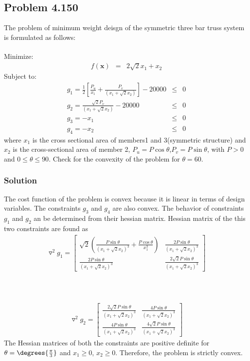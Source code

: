 \documentclass[]{report}
\begin{document}
\subsection*{Problem 4.150}
The problem of minimum weight deisgn of the symmetric three bar truss system is formulated as follows:\\~\\
Minimize:
\begin{eqnarray*}
f\left(\mathbf x\right) &=& 2\sqrt{2}x_1+x_2
\end{eqnarray*} 
Subject to:
\begin{eqnarray*}
g_1=\frac{1}{2}\left[\frac{P_u}{x_1}+\frac{P_v}{\left(x_1+\sqrt{2}x_2\right)}\right]-20000 &\leq& 0 \\
g_2=\frac{\sqrt{2} P_v}{\left(x_1+\sqrt{2}x_2\right)}-20000 &\leq& 0 \\
g_3=-x_1 &\leq& 0 \\
g_4=-x_2 &\leq& 0
\end{eqnarray*}
where $x_1$ is the cross sectional area of members1 and 3(symmetric structure) and $x_2$ is the cross-sectional area of member  2, $P_u=P \cos{\theta}$,$P_v=P \sin{\theta}$, with $P>0$ and $0\leq \theta \leq 90$. Check for the convexity of the problem for $\theta =60$.
\subsubsection*{Solution}
The cost function of the problem is convex because it is linear in terms of design variables. The constraints $g_3$ and $g_4$ are also convex.
The behavior of constraints $g_1$ and $g_2$ an be determined from their hessian matrix. Hessian matrix of the this two constraints are found as
\begin{eqnarray*}
\triangledown^2g_1=\left[\begin{array}{cc}
\sqrt{2}\left(\frac{P\sin\theta}{\left(x_1+\sqrt{2}x_2\right)^3}+\frac{P\cos\theta}{x_1^3}\right)&{}\frac{2P\sin\theta}{\left(x_1+\sqrt{2}x_2\right)^3}\\{}\frac{2P\sin\theta}{\left(x_1+\sqrt{2}x_2\right)^3}& \frac{2\sqrt{2}P\sin\theta}{\left(x_1+\sqrt{2}x_2\right)^3}
\end{array}\right]
\end{eqnarray*}
~\\~\\~
\begin{eqnarray*}
\triangledown^2g_2=\left[\begin{array}{cc}
\frac{2\sqrt{2}P\sin\theta}{\left(x_1+\sqrt{2}x_2\right)^3}&\frac{4P\sin\theta}{\left(x_1+\sqrt{2}x_2\right)^3}\\ \frac{4P\sin\theta}{\left(x_1+\sqrt{2}x_2\right)^3}& \frac{4\sqrt{2}P\sin\theta}{\left(x_1+\sqrt{2}x_2\right)^3}
\end{array}\right]
\end{eqnarray*}
The Hessian matrices of both the constraints are positive definite for $\theta=\degrees{\frac{\pi}{3}}$ and $x_1 \geq 0$, $x_2\geq 0$. Therefore, the problem is strictly convex.
\end{document}
